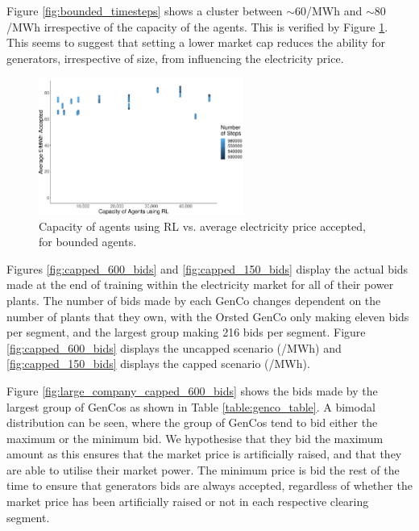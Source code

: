 Figure \ref{fig:bounded_timesteps} shows a cluster between ${\sim}$\textsterling$60$/MWh and ${\sim}$\textsterling$80$/MWh irrespective of the capacity of the agents. This is verified by Figure \ref{fig:bounded_results_scatter}. This seems to suggest that setting a lower market cap reduces the ability for generators, irrespective of size, from influencing the electricity price.






\begin{figure}
	\centering
	\includegraphics[width=0.6\textwidth]{Chapter7/Figures/results/bounded_results_scatter.pdf}
	\caption{Capacity of agents using RL vs. average electricity price accepted, for bounded agents.}
	\label{fig:bounded_results_scatter}
\end{figure}



Figures \ref{fig:capped_600_bids} and \ref{fig:capped_150_bids} display the actual bids made at the end of training within the electricity market for all of their power plants. The number of bids made by each GenCo changes dependent on the number of plants that they own, with the Orsted GenCo only making eleven bids per segment, and the largest group making 216 bids per segment. Figure \ref{fig:capped_600_bids} displays the uncapped scenario (/MWh) and \ref{fig:capped_150_bids} displays the capped scenario (/MWh).

Figure \ref{fig:large_company_capped_600_bids} shows the bids made by the largest group of GenCos as shown in Table \ref{table:genco_table}. A bimodal distribution can be seen, where the group of GenCos tend to bid either the maximum or the minimum bid. We hypothesise that they bid the maximum amount as this ensures that the market price is artificially raised, and that they are able to utilise their market power. The minimum price is bid the rest of the time to ensure that generators bids are always accepted, regardless of whether the market price has been artificially raised or not in each respective clearing segment.

